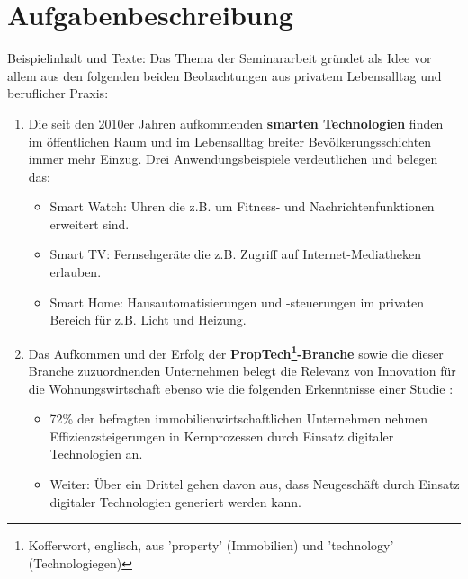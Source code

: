 \documentclass[12pt,oneside,titlepage]{scrartcl}
\begin{document}
\begin{acronym}[WoWi]\itemsep0pt %
\end{acronym}
\newpage

\setcounter{page}{1}








\section{Aufgabenbeschreibung}
Beispielinhalt und Texte:
Das Thema der Seminararbeit gründet als Idee vor allem aus den folgenden beiden Beobachtungen aus privatem Lebensalltag und beruflicher Praxis: 
\begin{enumerate}
	\item Die seit den 2010er Jahren aufkommenden \textbf{smarten Technologien} finden im öffentlichen Raum und im Lebensalltag breiter Bevölkerungsschichten immer mehr Einzug. Drei Anwendungsbeispiele verdeutlichen und belegen das: 
	\begin{itemize}
	 \item Smart Watch: Uhren die z.B. um Fitness- und Nachrichtenfunktionen erweitert sind.
	 \item Smart TV: Fernsehgeräte die z.B. Zugriff auf Internet-Mediatheken erlauben.
	 \item Smart Home: Hausautomatisierungen und -steuerungen im privaten Bereich für  z.B. Licht und Heizung.
	 \end{itemize}

	 \item Das Aufkommen und der Erfolg der \textbf{PropTech\footnote{Kofferwort, englisch, aus 'property' (Immobilien) und 'technology' (Technologiegen)}-Branche} sowie die dieser Branche zuzuordnenden Unternehmen belegt die Relevanz von Innovation für die Wohnungswirtschaft ebenso wie die folgenden Erkenntnisse einer Studie \parencite[S. 18]{zia}:
	 \begin{itemize}
		 \item 72\% der befragten immobilienwirtschaftlichen Unternehmen nehmen Effizienzsteigerungen in Kernprozessen durch Einsatz digitaler Technologien an.
		 \item Weiter: Über ein Drittel gehen davon aus, dass Neugeschäft durch Einsatz digitaler Technologien generiert werden kann. 
	 \end{itemize}
\end{enumerate}
\end{document}
